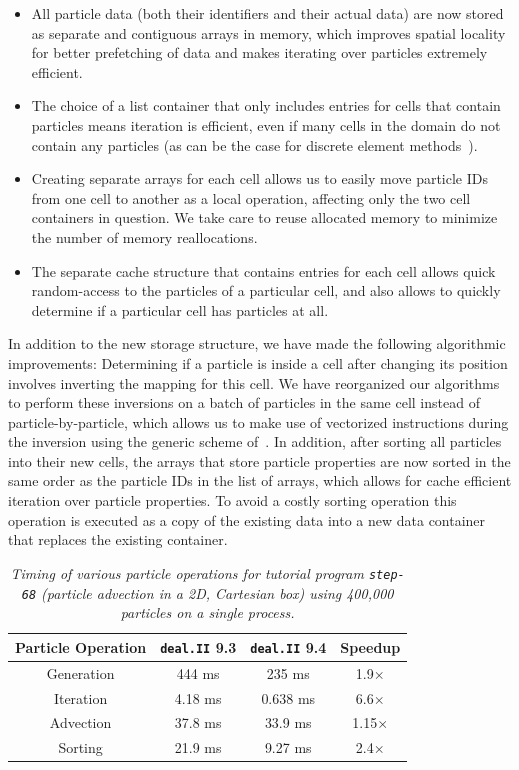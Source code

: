 \documentclass{ansarticle-preprint}
\newcommand{\specialword}[1]{\texttt{#1}}
\newcommand{\dealii}{{\specialword{deal.II}}\xspace}
\begin{document}
\begin{itemize}
\item All particle data (both their identifiers and their actual data) are now stored as separate and contiguous arrays in memory, which improves spatial locality for better prefetching of data and makes iterating over particles extremely efficient.
\item The choice of a list container that only includes entries for cells that contain particles means iteration is efficient, even if many cells in the domain do not contain any particles (as can be the case for discrete element methods~\cite{golshan2022lethe}).
\item Creating separate arrays for each cell allows us to easily move particle IDs from one cell to another as a local operation, affecting only the two cell containers in question. We take care to reuse allocated memory to minimize the number of memory reallocations.
\item The separate cache structure that contains entries for each cell allows quick random-access to the particles of a particular cell, and also allows to quickly determine if a particular cell has particles at all.
\end{itemize}

In addition to the new storage structure, we have made the following algorithmic improvements:
Determining if a particle is inside a cell after changing its position involves inverting the mapping for this cell. We have reorganized our algorithms to perform these inversions on a batch of particles in the same cell instead of particle-by-particle, which allows us to make use of vectorized instructions during the inversion using the generic scheme of~\cite{KronbichlerKormann2012}.
In addition, after sorting all particles into their new cells, the arrays that store particle properties are now sorted in the same order as the particle IDs in the list of arrays, which allows for cache efficient iteration over particle properties. To avoid a costly sorting operation this operation is executed as a copy of the existing data into a new data container that replaces the existing container.

\begin{table}
  \caption{\it Timing of various particle operations for tutorial program \texttt{step-68} (particle advection in a 2D, Cartesian box) using 400,000 particles on a single process.}
  \label{tab:particle_timing}

  \centering
  \begin{tabular}{|c|c|c|c|}
    \hline
   Particle Operation & \dealii 9.3 & \dealii 9.4 & Speedup \\
   \hline
   Generation & 444 ms & 235 ms & 1.9$\times$ \\
   Iteration & 4.18 ms & 0.638 ms & 6.6$\times$ \\
   Advection & 37.8 ms & 33.9 ms & 1.15$\times$ \\
   Sorting & 21.9 ms & 9.27 ms & 2.4$\times$ \\
   \hline
  \end{tabular}
  \end{table}
\end{document}
